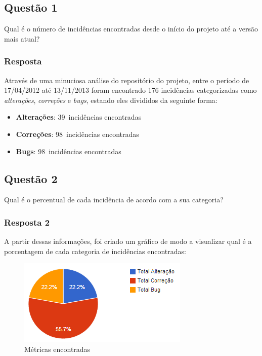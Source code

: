 \documentclass[11pt, a4paper]{article}
\begin{document}
\subsection{Questão 1}\label{sec:questao-1}
Qual é o número de incidências encontradas desde o início do projeto até a versão mais atual?

\subsubsection{Resposta}
Através de uma minuciosa análise do repositório do projeto, entre o período de 17/04/2012 até 13/11/2013 foram encontrado 176 incidências categorizadas como \textit{alterações}, \textit{correções} e \textit{bugs}, estando eles divididos da seguinte forma:

\newcommand{\alteracoes}{39}
\newcommand{\correcoes}{98}
\newcommand{\bugs}{98}

\begin{itemize}
	\item \textbf{Alterações}: \alteracoes~incidências encontradas
	\item \textbf{Correções}: \correcoes~incidências encontradas
	\item \textbf{Bugs}: \bugs~incidências encontradas
\end{itemize}

\subsection{Questão 2}\label{sec:questao-2}
Qual é o percentual de cada incidência de acordo com a sua categoria?

\subsubsection{Resposta 2}
A partir dessas informações, foi criado um gráfico de modo a visualizar qual é a porcentagem de cada categoria de incidências encontradas:

\begin{figure}[H]
  \caption{Métricas encontradas}
  \centering 
  \includegraphics{images/graphic.png}
\end{figure}
\cite{metricas-sao-silvestre}
\end{document}
